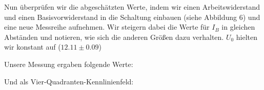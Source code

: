 \begin{center}
\begin{minipage}{\linewidth}
\centering
{}
%
\label{Schaltplan2}
\end{minipage}
\end{center}

Nun überprüfen wir die abgeschätzten Werte, indem wir einen Arbeitswiderstand und einen Basisvorwiderstand in die Schaltung einbauen (siehe Abbildung 6) und eine neue Messreihe aufnehmen. Wir steigern dabei die Werte für \(I_B\) in gleichen Abständen und notieren, wie sich die anderen Größen dazu verhalten. \(U_0\) hielten wir konstant auf (\(12.11\pm 0.09\))

Unsere Messung ergaben folgende Werte:\\

\begin{center}

\end{center}
\newpage
Und als Vier-Quadranten-Kennlinienfeld:
\begin{center}
\begin{minipage}{\linewidth}
\centering
{}
%
\label{dynamisches kennlinienfeld}
\end{minipage}
\end{center}

